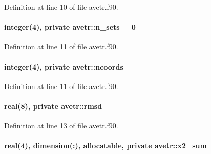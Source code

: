 Definition at line 10 of file avetr.\-f90.

\hypertarget{classavetr_a1e665f474774be9641fd289ab440af46}{
\paragraph[{n\-\_\-sets}]{\setlength{\rightskip}{0pt plus 5cm}integer(4), private avetr\-::n\-\_\-sets = 0\hspace{0.3cm}{\ttfamily [private]}}}\label{classavetr_a1e665f474774be9641fd289ab440af46}


Definition at line 11 of file avetr.\-f90.

\hypertarget{classavetr_aac33219078a4caefc24fe6a48269716b}{
\paragraph[{ncoords}]{\setlength{\rightskip}{0pt plus 5cm}integer(4), private avetr\-::ncoords\hspace{0.3cm}{\ttfamily [private]}}}\label{classavetr_aac33219078a4caefc24fe6a48269716b}


Definition at line 11 of file avetr.\-f90.

\hypertarget{classavetr_a80bb301aee7342978b0020cf5a614543}{
\paragraph[{rmsd}]{\setlength{\rightskip}{0pt plus 5cm}real(8), private avetr\-::rmsd\hspace{0.3cm}{\ttfamily [private]}}}\label{classavetr_a80bb301aee7342978b0020cf5a614543}


Definition at line 13 of file avetr.\-f90.

\hypertarget{classavetr_a017f3115d54d6c2f83e70bf2a590539f}{
\paragraph[{x2\-\_\-sum}]{\setlength{\rightskip}{0pt plus 5cm}real(4), dimension(\-:), allocatable, private avetr\-::x2\-\_\-sum\hspace{0.3cm}{\ttfamily [private]}}}\label{classavetr_a017f3115d54d6c2f83e70bf2a590539f}


